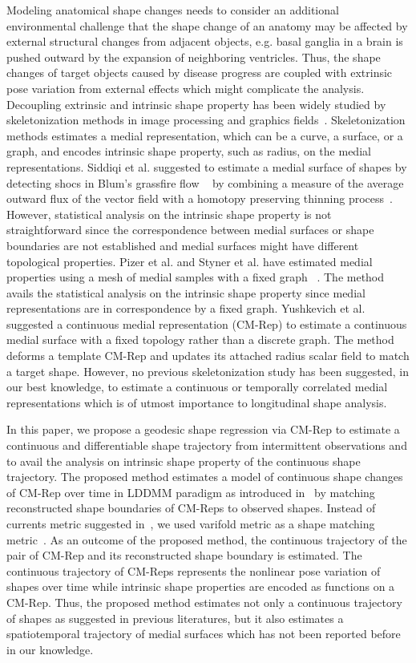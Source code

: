\documentclass[runningheads,a4paper]{llncs}
\begin{document}
Modeling anatomical shape changes needs to consider an additional environmental challenge that the shape change of an anatomy may be affected by external structural changes from adjacent objects, 
e.g. basal ganglia in a brain is pushed outward by the expansion of neighboring ventricles. 
Thus, the shape changes of target objects caused by disease progress are coupled with extrinsic pose variation from external effects which might complicate the analysis. 
Decoupling extrinsic and intrinsic shape property has been widely studied by skeletonization methods in image processing and graphics fields~\cite{Taglia2016}. 
Skeletonization methods estimates a medial representation, which can be a curve, a surface, or a graph, and encodes intrinsic shape property, such as radius, on the medial representations. 
Siddiqi et al. suggested to estimate a medial surface of shapes by detecting shocs in Blum's grassfire flow ~\cite{Blum1973} by combining a measure of the average outward flux of the vector field with a homotopy preserving thinning process~\cite{Siddiqi2002}. However, statistical analysis on the intrinsic shape property is not straightforward since the correspondence between medial surfaces or shape boundaries are not established and medial surfaces might have different topological properties. 
Pizer et al. and Styner et al. have estimated medial properties using a mesh of medial samples with a fixed graph~\cite{Pizer2003, Styner2003} . 
The method avails the statistical analysis on the intrinsic shape property since medial representations are in correspondence by a fixed graph. 
Yushkevich et al. suggested a continuous medial representation (CM-Rep) to estimate a continuous medial surface with a fixed topology rather than a discrete graph. 
The method deforms a template CM-Rep and updates its attached radius scalar field to match a target shape. 
However, no previous skeletonization study has been suggested, in our best knowledge, to estimate a continuous or temporally correlated medial representations which is of utmost importance to longitudinal shape analysis.

In this paper, we propose a geodesic shape regression via CM-Rep to estimate a continuous and differentiable shape trajectory from intermittent observations and to avail the analysis on intrinsic shape property of the continuous shape trajectory. 
The proposed method estimates a model of continuous shape changes of CM-Rep over time in LDDMM paradigm as introduced in~\cite{Fishbaugh2013} by matching reconstructed shape boundaries of CM-Reps to observed shapes. Instead of currents metric suggested in~\cite{Fishbaugh2013}, we used varifold metric as a shape matching metric~\cite{Charon2013, Rekik2016}. As an outcome of the proposed method, the continuous trajectory of the pair of CM-Rep and its reconstructed shape boundary is estimated. The continuous trajectory of CM-Reps represents the nonlinear pose variation of shapes over time while intrinsic shape properties are encoded as functions on a CM-Rep.
Thus, the proposed method estimates not only a continuous trajectory of shapes as suggested in previous literatures, but it also estimates a spatiotemporal trajectory of medial surfaces which has not been reported before in our knowledge. 
\end{document}
